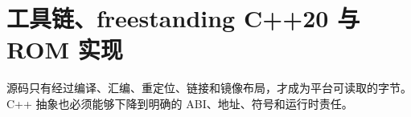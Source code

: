 \chapter{工具链、freestanding C++20 与 ROM 实现}

\begin{keyidea}
源码只有经过编译、汇编、重定位、链接和镜像布局，才成为平台可读取的字节。
C++ 抽象也必须能够下降到明确的 ABI、地址、符号和运行时责任。
\end{keyidea}





